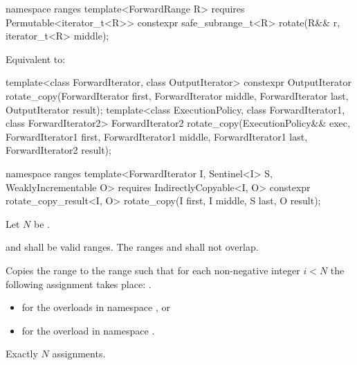 \begin{itemdecl}
namespace ranges {
  template<ForwardRange R>
    requires Permutable<iterator_t<R>>
    constexpr safe_subrange_t<R> rotate(R&& r, iterator_t<R> middle);
}
\end{itemdecl}

\begin{itemdescr}
\pnum
\effects Equivalent to:
\end{itemdescr}

%
\begin{itemdecl}
template<class ForwardIterator, class OutputIterator>
  constexpr OutputIterator
    rotate_copy(ForwardIterator first, ForwardIterator middle, ForwardIterator last,
                OutputIterator result);
template<class ExecutionPolicy, class ForwardIterator1, class ForwardIterator2>
  ForwardIterator2
    rotate_copy(ExecutionPolicy&& exec,
                ForwardIterator1 first, ForwardIterator1 middle, ForwardIterator1 last,
                ForwardIterator2 result);

namespace ranges {
  template<ForwardIterator I, Sentinel<I> S, WeaklyIncrementable O>
    requires IndirectlyCopyable<I, O>
    constexpr rotate_copy_result<I, O>
      rotate_copy(I first, I middle, S last, O result);
}
\end{itemdecl}

\begin{itemdescr}
\pnum
Let $N$ be .

\pnum
\requires
{}
and
shall be valid ranges.
The ranges
and
shall not overlap.

\pnum
\effects
Copies the range
to the range
such that for each non-negative integer
$i < N$
the following assignment takes place:
.

\pnum
\returns
\begin{itemize}
\item
{} for the overloads in namespace , or
\item
{} for the overload in
  namespace .
\end{itemize}

\pnum
\complexity
Exactly $N$ assignments.
\end{itemdescr}

